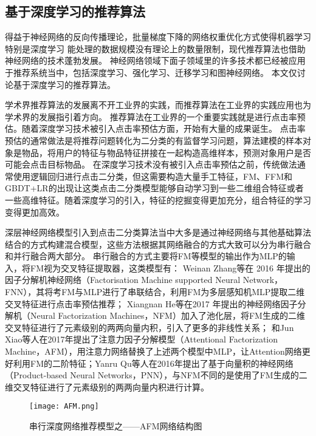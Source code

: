 \subsection{基于深度学习的推荐算法}

得益于神经网络的反向传播理论，批量梯度下降的网络权重优化方式使得机器学习特别是深度学习%
能处理的数据规模没有理论上的数量限制，现代推荐算法也借助神经网络的技术蓬勃发展。%
神经网络领域下面子领域里的许多技术都已经被应用于推荐系统当中，包括深度学习、强化学习、迁移学习和图神经网络。%
本文仅讨论基于深度学习的推荐算法。

学术界推荐算法的发展离不开工业界的实践，而推荐算法在工业界的实践应用也为学术界的发展指引着方向。
推荐算法在工业界的一个重要实践就是进行点击率预估。随着深度学习技术被引入点击率预估方面，开始有大量的成果诞生。
点击率预估的通常做法是将推荐问题转化为二分类的有监督学习问题，算法建模的样本对象是物品，将用户的特征与物品特征拼接在一起构造高维样本，预测对象用户是否可能会点击目标物品。
在深度学习技术没有被引入点击率预估之前，传统做法通常使用逻辑回归进行点击二分类，但这需要构造大量手工特征，FM、FFM和GBDT+LR的出现让这类点击二分类模型能够自动学习到一些二维组合特征或者一些高维特征。随着深度学习的引入，特征的挖掘变得更加充分，组合特征的学习变得更加高效。

深层神经网络模型引入到点击二分类算法当中大多是通过神经网络与其他基础算法结合的方式构建混合模型，这些方法根据其网络融合的方式大致可以分为串行融合和并行融合两大部分。
串行融合的方式主要将FM等模型的输出作为MLP的输入，将FM视为交叉特征提取器，这类模型有：
Weinan Zhang等在 2016 年提出的因子分解机神经网络（Factorisation Machine supported Neural Network，FNN），其将考FM与MLP进行了串联结合，利用FM为多层感知机MLP提取二维交叉特征进行点击率预估推荐；
Xiangnan He等在2017 年提出的神经网络因子分解机（Neural Factorization Machines，NFM）加入了池化层，将FM生成的二维交叉特征进行了元素级别的两两向量内积，引入了更多的非线性关系；
和Jun Xiao等人在2017年提出了注意力因子分解模型（Attentional Factorization Machine，AFM），用注意力网络替换了上述两个模型中MLP，让Attention网络更好利用FM的二阶特征；Yanru Qu等人在2016年提出了基于向量积的神经网络（Product-based Neural Networks，PNN），与NFM不同的是使用了FM生成的二维交叉特征进行了元素级别的两两向量内积进行计算。
\begin{figure}[htb]
  \centering
  \texttt{[image: AFM.png]}\\
  \caption{串行深度网络推荐模型之——AFM网络结构图}
  \label{fig:AFM}
\end{figure}

